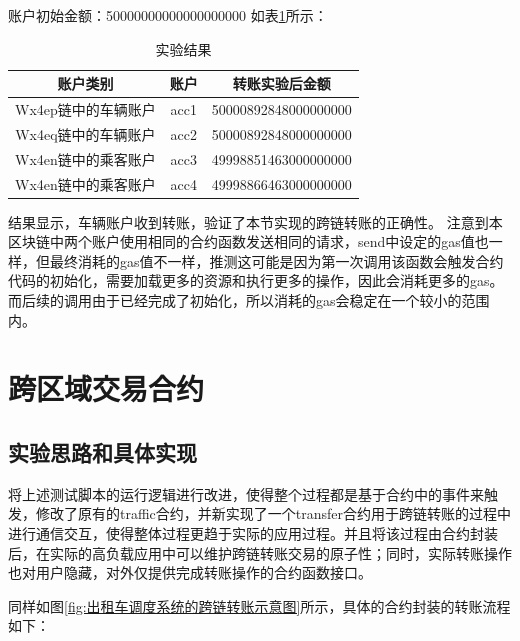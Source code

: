 账户初始金额：50000000000000000000
如表\ref{实验结果}所示：

\begin{table}
    \linespread{1.5}
    \centering
    \caption{实验结果}\label{实验结果}
    \begin{tabular}{ccc} \toprule
        账户类别                & 账户                 & 转账实验后金额            \\ \hline
        Wx4ep链中的车辆账户 & acc1   & 50000892848000000000                \\
        Wx4eq链中的车辆账户 & acc2   & 50000892848000000000                \\
        Wx4en链中的乘客账户 & acc3   & 49998851463000000000 
        \\
        Wx4en链中的乘客账户 & acc4   & 49998866463000000000
        \\\bottomrule
    \end{tabular}
\end{table}

结果显示，车辆账户收到转账，验证了本节实现的跨链转账的正确性。
注意到本区块链中两个账户使用相同的合约函数发送相同的请求，send中设定的gas值也一样，但最终消耗的gas值不一样，推测这可能是因为第一次调用该函数会触发合约代码的初始化，需要加载更多的资源和执行更多的操作，因此会消耗更多的gas。而后续的调用由于已经完成了初始化，所以消耗的gas会稳定在一个较小的范围内。

\section{跨区域交易合约}

\subsection{实验思路和具体实现}

将上述测试脚本的运行逻辑进行改进，使得整个过程都是基于合约中的事件来触发，修改了原有的traffic合约，并新实现了一个transfer合约用于跨链转账的过程中进行通信交互，使得整体过程更趋于实际的应用过程。并且将该过程由合约封装后，在实际的高负载应用中可以维护跨链转账交易的原子性；同时，实际转账操作也对用户隐藏，对外仅提供完成转账操作的合约函数接口。

同样如图\ref{fig:出租车调度系统的跨链转账示意图}所示，具体的合约封装的转账流程如下：

